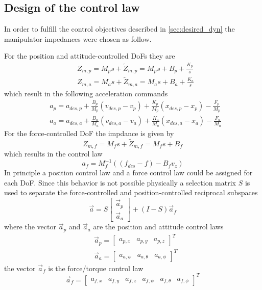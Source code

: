 \subsection{Design of the control law}
In order to fulfill the control objectives described in \ref{sec:desired_dyn}
the manipulator impedances were chosen as follow.
\par
For the position and attitude-controlled DoFs they are
\[
\begin{split}
  &Z_{m,p} = M_p s + \tilde{Z}_{m,p} = M_p s + B_p + \frac{K_p}{s}\\
  &Z_{m,a} = M_a s + \tilde{Z}_{m,a} = M_a s + B_a + \frac{K_a}{s}
\end{split}
\]
which result in the following acceleration commands
\[
\begin{split}
  &a_{p} = a_{des,p} + \frac{B_p}{M_p} (v_{des,p} - v_p) + \frac{K_p}{M_p} (x_{des,p} - x_p) - \frac{F_p}{M_p}\\
  &a_a = a_{des,a} + \frac{B_a}{M_a} (v_{des,a} - v_a) + \frac{K_a}{M_a} (x_{des,a} - x_a) - \frac{F_a}{M_a}
\end{split}
\]
For the force-controlled DoF the impdance is given by
\[
Z_{m,f} = M_f s + \tilde{Z}_{m,f} = M_f s + B_f
\]
which results in the control law
\[  
a_{f} = M_f^{-1}((f_{des} - f) - B_f v_z)
\]
In principle a position control law and a force control law could be assigned for each DoF. Since this
behavior is not possible physically a selection matrix $S$ is used to separate the force-controlled and position-controlled reciprocal subspaces
\[
\vec{a} = S 
\begin{bmatrix}
  \vec{a}_p \\
  \vec{a}_a
\end{bmatrix} + (I - S) \vec{a}_f
\]
where the vector $\vec{a}_p$ and $\vec{a}_a$ are the position and attitude control laws
\[
\begin{split}
  &\vec{a}_p = 
  \begin{bmatrix}
    a_{p,x} & a_{p,y} & a_{p,z}
  \end{bmatrix}^T\\
  &\vec{a}_a = 
  \begin{bmatrix}
    a_{a, \psi} & a_{a, \theta} & a_{a, \phi}
  \end{bmatrix}^T
\end{split}
\]
the vector $\vec{a}_f$ is the force/torque control law
\[
\vec{a}_f = 
\begin{bmatrix}
  a_{f,x} & a_{f,y} & a_{f,z} & a_{f, \psi} & a_{f, \theta} & a_{f, \phi}
\end{bmatrix}^T
\]
